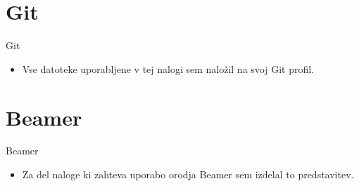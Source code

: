 \documentclass{beamer}
\begin{document}
\section{Git}
\begin{frame}{Git}
    \begin{itemize}
        \item Vse datoteke uporabljene v tej nalogi sem naložil na svoj Git profil.
    \end{itemize}
\end{frame}


\section{Beamer}
\begin{frame}{Beamer}
    \begin{itemize}
        \item Za del naloge ki zahteva uporabo orodja Beamer sem izdelal to predstavitev.
    \end{itemize}
\end{frame}
\end{document}
